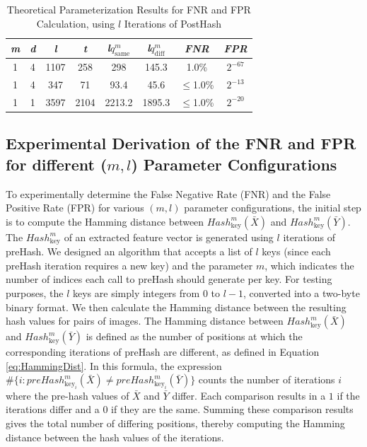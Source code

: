\begin{table}[htbp] 
    \centering
    \begin{tabular}{|c|c|c|c|c|c|c|c|}
        \hline
        \textit{m} & \textit{d} & \textit{l} & \textit{t} & \textit{l}\(q_{\text{same}}^m\) & \textit{l}\(q_{\text{diff}}^m\) & \textit{FNR} & \textit{FPR} \\
        \hline
        1 & 4 & 1107 & 258 & 298 & 145.3 & 1.0\% & \(2^{-67}\) \\
        1 & 4 & 347 & 71 & 93.4 & 45.6 & \(\leq\)1.0\% & \(2^{-13}\)\\
        1 & 1 & 3597 & 2104 & 2213.2 & 1895.3 & \(\leq\)1.0\% & \(2^{-20}\)\\
        \hline
    \end{tabular}
    \caption{Theoretical Parameterization Results for FNR and FPR Calculation, using $l$ Iterations of PostHash}
    \label{tab:theoretical_parameterization_PostHash}
\end{table}


\newpage
\subsection{Experimental Derivation of the FNR and FPR for different (\(m, l\)) Parameter Configurations}

To experimentally determine the False Negative Rate (FNR) and the False Positive Rate (FPR) for various \((m, l)\) parameter configurations, the initial step is to compute the Hamming distance between \( Hash_{\text{key}}^m(\bar{X}) \) and \( Hash_{\text{key}}^m(\bar{Y}) \). The \( Hash_{\text{key}}^m \) of an extracted feature vector is generated using \( l \) iterations of preHash. We designed an algorithm that accepts a list of \( l \) keys (since each preHash iteration requires a new key) and the parameter \( m \), which indicates the number of indices each call to preHash should generate per key. For testing purposes, the \( l \) keys are simply integers from 0 to \( l-1 \), converted into a two-byte binary format. We then calculate the Hamming distance between the resulting hash values for pairs of images. The Hamming distance between \( Hash_{\text{key}}^m(\bar{X}) \) and \( Hash_{\text{key}}^m(\bar{Y}) \) is defined as the number of positions at which the corresponding iterations of preHash are different, as defined in Equation \ref{eq:HammingDist}. In this formula, the expression \( \# \{ i : preHash_{\text{key}_i}^m(\bar{X}) \neq preHash_{\text{key}_i}^m(\bar{Y}) \} \) counts the number of iterations \( i \) where the pre-hash values of \( \bar{X} \) and \( \bar{Y} \) differ. Each comparison results in a \(1\) if the iterations differ and a \(0\) if they are the same. Summing these comparison results gives the total number of differing positions, thereby computing the Hamming distance between the hash values of the iterations.



